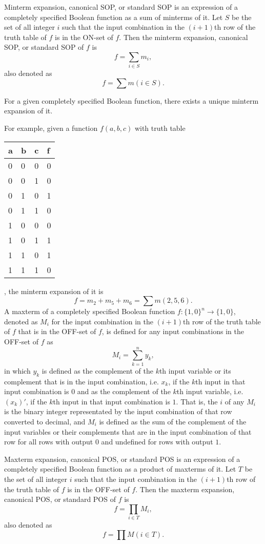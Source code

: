 \documentclass[a4paper,12pt]{article}
\begin{document}
\begin{itemize}
\begin{itemize}
\begin{itemize}
\begin{itemize}
\begin{itemize}
\begin{itemize}
\begin{itemize}
Minterm expansion, canonical SOP, or standard SOP is an expression of a completely specified Boolean function as a sum of minterms of it. Let $S$ be the set of all integer $i$ such that the input combination in the $(i+1)$th row of the truth table of $f$ is in the ON-set of $f$. Then the minterm expansion, canonical SOP, or standard SOP of $f$ is
\[f=\sum_{i\in S}m_i,\]
also denoted as
\[f=\sum m(i\in S).\]

For a given completely specified Boolean function, there exists a unique minterm expansion of it.

For example, given a function $f(a,b,c)$ with truth table
\begin{longtable}[c]{|m|m|m|m|}
\hline
a & b & c & f\\\hline
0 & 0 & 0 & 0\\\hline
0 & 0 & 1 & 0\\\hline
0 & 1 & 0 & 1\\\hline
0 & 1 & 1 & 0\\\hline
1 & 0 & 0 & 0\\\hline
1 & 0 & 1 & 1\\\hline
1 & 1 & 0 & 1\\\hline
1 & 1 & 1 & 0\\\hline
\end{longtable}
, the minterm expansion of it is
\[f=m_2+m_5+m_6=\sum m(2,5,6).\]
A maxterm of a completely specified Boolean function $f\colon\{1,0\}^n\to\{1,0\}$, denoted as $M_i$ for the input combination in the $(i+1)$th row of the truth table of $f$ that is in the OFF-set of $f$, is defined for any input combinations in the OFF-set of $f$ as
\[M_i=\sum_{k=1}^ny_k,\]
in which $y_k$ is defined as the complement of the $k$th input variable or its complement that is in the input combination, i.e. $x_k$, if the $k$th input in that input combination is $0$ and as the complement of the $k$th input variable, i.e. $(x_k)'$, if the $k$th input in that input combination is $1$. That is, the $i$ of any $M_i$ is the binary integer representated by the input combination of that row converted to decimal, and $M_i$ is defined as the sum of the complement of the input variables or their complements that are in the input combination of that row for all rows with output $0$ and undefined for rows with output $1$.

Maxterm expansion, canonical POS, or standard POS is an expression of a completely specified Boolean function as a product of maxterms of it. Let $T$ be the set of all integer $i$ such that the input combination in the $(i+1)$th row of the truth table of $f$ is in the OFF-set of $f$. Then the maxterm expansion, canonical POS, or standard POS of $f$ is
\[f=\prod_{i\in T}M_i,\]
also denoted as 
\[f=\prod M(i\in T).\]


\end{itemize}
\end{itemize}
\end{itemize}
\end{itemize}
\end{itemize}
\end{itemize}
\end{itemize}
\end{document}
